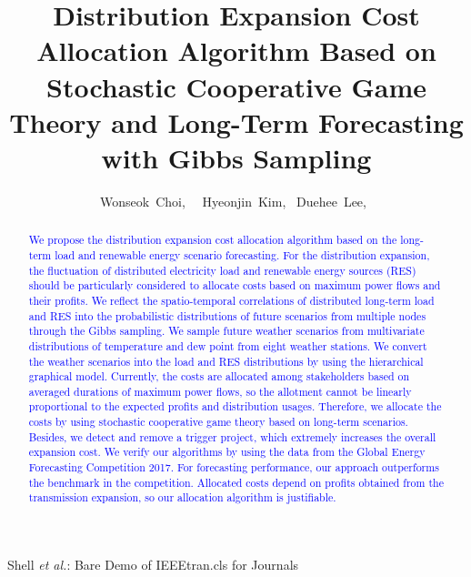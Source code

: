 \documentclass[journal]{IEEEtran} %
\begin{document}
\title{Distribution Expansion Cost Allocation Algorithm Based on Stochastic Cooperative Game Theory and Long-Term Forecasting with Gibbs Sampling}

\author{Wonseok~Choi,~ ~Hyeonjin~Kim,~
	Duehee~Lee,~
	}





{Shell \MakeLowercase{\textit{et al.}}: Bare Demo of IEEEtran.cls for Journals}
\maketitle



\begin{abstract}
\textcolor{blue}{We propose the distribution expansion cost allocation algorithm based on the long-term load and renewable energy scenario forecasting. For the distribution expansion, the fluctuation of distributed electricity load and renewable energy sources (RES) should be particularly considered to allocate costs based on maximum power flows and their profits. We reflect the spatio-temporal correlations of distributed long-term load and RES into the probabilistic distributions of future scenarios from multiple nodes through the Gibbs sampling.
%
We sample future weather scenarios from multivariate distributions of temperature and dew point from eight weather stations. We convert the weather scenarios into the load and RES distributions by using the hierarchical graphical model. 
%
Currently, the costs are allocated among stakeholders based on averaged durations of maximum power flows, so the allotment cannot be linearly proportional to the expected profits and distribution usages. Therefore, we allocate the costs by using stochastic cooperative game theory based on long-term scenarios. Besides, we detect and remove a trigger project, which extremely increases the overall expansion cost.
%
We verify our algorithms by using the data from the Global Energy Forecasting Competition 2017. For forecasting performance, our approach outperforms the benchmark in the competition. Allocated costs depend on profits obtained from the transmission expansion, so our allocation algorithm is justifiable.}
\end{abstract}



\end{document}
